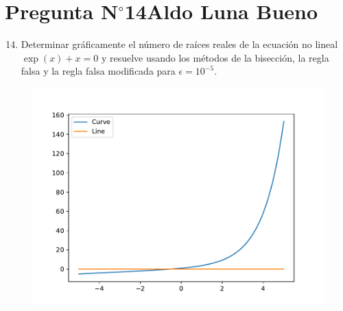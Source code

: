 \section{Pregunta N$^{\circ}$14\qquad Aldo Luna Bueno}

\begin{frame}
	\begin{enumerate}\setcounter{enumi}{13}
		\item

		      Determinar gráficamente el número de raíces reales de la
		      ecuación no lineal
		      \begin{math}
			      \exp\left(x\right)+x=
			      0
		      \end{math}
		      y resuelve usando los métodos de la bisección, la regla
		      falsa y la regla falsa modificada para $\epsilon=10^{-5}$.

	\end{enumerate}

	\begin{solution}

		\begin{figure}
			\includegraphics[width=0.5\paperwidth]{p14.pdf}
		\end{figure}
	\end{solution}

        \begin{solution}


\end{solution}
\end{frame}
